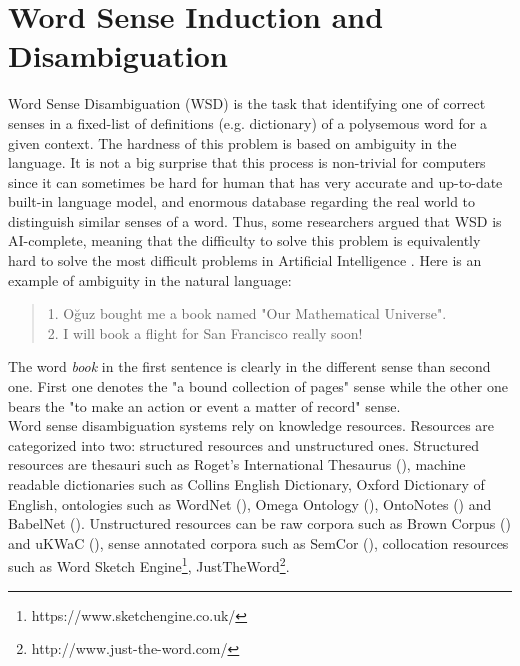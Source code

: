 \section{Word Sense Induction and Disambiguation}

Word Sense Disambiguation (WSD) is the task that identifying one of correct senses in a fixed-list of definitions (e.g. dictionary) of a polysemous word for a given context. The hardness of this problem is based on ambiguity in the language. It is not a big surprise that this process is non-trivial for computers since it can sometimes be hard for human that has very accurate and up-to-date built-in language model, and enormous database regarding the real world to distinguish similar senses of a word. Thus, some researchers argued that WSD is AI-complete, meaning that the difficulty to solve this problem is equivalently hard to solve the most difficult problems in Artificial Intelligence \cite{mallery1988thinking}. Here is an example of ambiguity in the natural language: \\

\begin{quote}
1. Oğuz bought me a book named "Our Mathematical Universe".\\ 2. I will book a flight for San Francisco really soon!
\end{quote}


The word \emph{book} in the first sentence is clearly in the different sense than second one. First one denotes the "a bound collection of pages" sense while the other one bears the "to make an action or event a matter of record" sense. \\

Word sense disambiguation systems rely on knowledge resources. Resources are categorized into two: structured resources and unstructured ones. Structured resources are thesauri such as Roget's International Thesaurus (\cite{chapman1984roget}), machine readable dictionaries such as Collins English Dictionary, Oxford Dictionary of English, ontologies such as WordNet (\cite{fellbaum98electronic}), Omega Ontology (\cite{philpot2005omega}), OntoNotes (\cite{hovy06ontonotes}) and BabelNet (\cite{navigli2012babelnet}). Unstructured resources can be raw corpora such as Brown Corpus (\cite{francis1979brown}) and uKWaC (\cite{ukWaC}), sense annotated corpora such as SemCor (\cite{mihalcea1998semcor}), collocation resources such as Word Sketch Engine\footnote{https://www.sketchengine.co.uk/}, JustTheWord\footnote{http://www.just-the-word.com/}. \\

